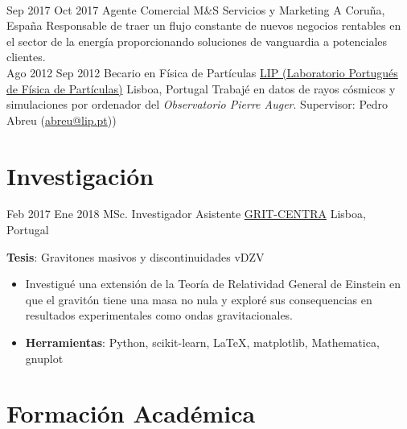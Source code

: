 \documentclass[letterpaper]{twentysecondcv} %
\begin{document}
\begin{twenty}
{\begin{itemize}
        \end{itemize}}
        \\
    \twentyitem
        {Sep 2017}
        {Oct 2017}
        {Agente Comercial}
        {M\&S Servicios y Marketing}
        {A Coruña, España}
        {Responsable de traer un flujo constante de nuevos negocios rentables en el sector de la energía proporcionando soluciones de vanguardia a potenciales clientes.}
    \\   
    \twentyitem
        {Ago 2012}
        {Sep 2012}
        {Becario en Física de Partículas}
        {\href{https://www.lip.pt}{LIP (Laboratorio Portugués de Física de Partículas)}}
        {Lisboa, Portugal}
        {Trabajé en datos de rayos cósmicos y simulaciones por ordenador del \emph{Observatorio Pierre Auger}. Supervisor: Pedro Abreu (\href{mailto:abreu@lip.pt}{abreu@lip.pt}))
        }
\end{twenty}

\section{Investigación}
\begin{twenty}
    \twentyitem
        {Feb 2017}
        {Ene 2018}
        {MSc.  Investigador Asistente}
        {\href{https://centra.tecnico.ulisboa.pt/network/grit/team/}{GRIT-CENTRA}}
        {Lisboa, Portugal}
        {
        \textbf{Tesis}: Gravitones masivos y discontinuidades vDZV
        {\begin{itemize}
        \item Investigué una extensión de la Teoría de Relatividad General de Einstein en que el gravitón tiene una masa no nula y exploré sus consequencias en resultados experimentales como ondas gravitacionales.
        \item \textbf{Herramientas}: Python, scikit-learn, \LaTeX, matplotlib, Mathematica, gnuplot
        \end{itemize}}
        }
\end{twenty}

\section{Formación Académica}
\end{document}
